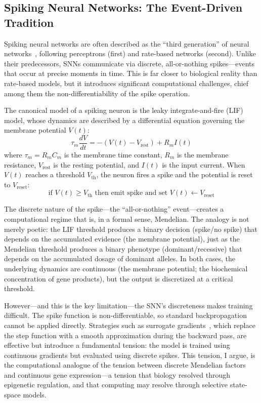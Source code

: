 \documentclass[12pt,a4paper]{article}
\begin{document}
\subsection{Spiking Neural Networks: The Event-Driven Tradition}
\label{sec:snn-lif}

Spiking neural networks are often described as the ``third generation'' of neural networks~\cite{maass1997}, following perceptrons (first) and rate-based networks (second). Unlike their predecessors, SNNs communicate via discrete, all-or-nothing spikes---events that occur at precise moments in time. This is far closer to biological reality than rate-based models, but it introduces significant computational challenges, chief among them the non-differentiability of the spike operation.

The canonical model of a spiking neuron is the leaky integrate-and-fire (LIF) model, whose dynamics are described by a differential equation governing the membrane potential $V(t)$:
\begin{equation}
\tau_m \frac{dV}{dt} = -(V(t) - V_{\text{rest}}) + R_m I(t) \label{eq:lif}
\end{equation}
where $\tau_m = R_m C_m$ is the membrane time constant, $R_m$ is the membrane resistance, $V_{\text{rest}}$ is the resting potential, and $I(t)$ is the input current. When $V(t)$ reaches a threshold $V_{\text{th}}$, the neuron fires a spike and the potential is reset to $V_{\text{reset}}$:
\begin{equation}
\text{if } V(t) \geq V_{\text{th}} \text{ then emit spike and set } V(t) \leftarrow V_{\text{reset}} \label{eq:lif-threshold}
\end{equation}

The discrete nature of the spike---the ``all-or-nothing'' event---creates a computational regime that is, in a formal sense, Mendelian. The analogy is not merely poetic: the LIF threshold produces a binary decision (spike/no spike) that depends on the accumulated evidence (the membrane potential), just as the Mendelian threshold produces a binary phenotype (dominant/recessive) that depends on the accumulated dosage of dominant alleles. In both cases, the underlying dynamics are continuous (the membrane potential; the biochemical concentration of gene products), but the output is discretized at a critical threshold.

However---and this is the key limitation---the SNN's discreteness makes training difficult. The spike function is non-differentiable, so standard backpropagation cannot be applied directly. Strategies such as surrogate gradients~\cite{neftci2019}, which replace the step function with a smooth approximation during the backward pass, are effective but introduce a fundamental tension: the model is trained using continuous gradients but evaluated using discrete spikes. This tension, I argue, is the computational analogue of the tension between discrete Mendelian factors and continuous gene expression---a tension that biology resolved through epigenetic regulation, and that computing may resolve through selective state-space models.
\end{document}
